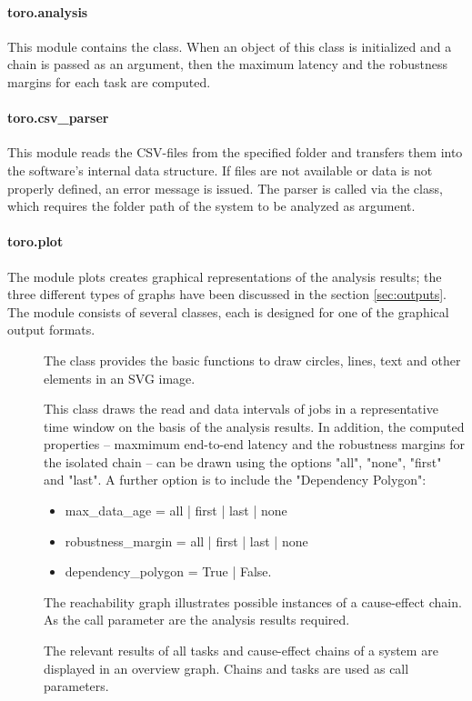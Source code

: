 \paragraph{toro.analysis}
This module contains the  class.
When an object of this class is initialized and a chain is passed as an argument, then the maximum latency and the robustness margins for each task are computed.

\paragraph{toro.csv\_parser}
This module reads the CSV-files from the specified folder and transfers them into the software's internal data structure. 
If files are not available or data is not properly defined, an error message is issued. 
The parser is called via the  class, which requires the folder path of the system to be analyzed as argument.

\paragraph{toro.plot}
The module plots creates graphical representations of the analysis results; the three different types of graphs have been discussed in the section \ref{sec:outputs}.
The module consists of several classes, each is designed for one of the graphical output formats. 

\begin{description}
\item[] 
The  class provides the basic functions to draw circles, lines, text and other elements in an SVG image.  
%
\item[] 
This class draws the read and data intervals of jobs in a representative time window on the basis of the analysis results. 
In addition, the computed properties -- maxmimum end-to-end latency and the robustness margins for the isolated chain -- can be drawn using the options "all", "none", "first" and "last". 
A further option is to include the "Dependency Polygon":
\begin{itemize}
		\item max\_data\_age = all | first | last | none
		\item robustness\_margin = all | first | last | none
		\item dependency\_polygon = True | False.
\end{itemize}    
												
\item[] 
The reachability graph illustrates possible instances of a cause-effect chain. As the call parameter are the analysis results required.
%
\item[] 
The relevant results of all tasks and cause-effect chains of a system are displayed in an overview graph. 
Chains and tasks are used as call parameters. 
%
\end{description}